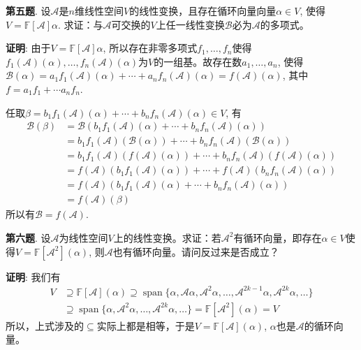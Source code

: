 {\newpageorvspace


{\bf 第五题}. 设$\mathscr{A}$是$n$维线性空间$V$的线性变换，且存在循环向量向量$\alpha \in V$, 使得$V = \mathbb{F}[\mathscr{A}]\alpha$. 求证：与$\mathscr{A}$可交换的$V$上任一线性变换$\mathscr{B}$必为$\mathscr{A}$的多项式。

\newpageorvspace

{\bf 证明}: 由于$V = \mathbb{F}[\mathscr{A}]\alpha$, 所以存在非零多项式$f_1, \ldots, f_n$使得$f_1(\mathscr{A})(\alpha), \ldots, f_n(\mathscr{A})(\alpha)$为$V$的一组基。故存在数$a_1, \ldots, a_n$, 使得$\mathscr{B}(\alpha) = a_1 f_1(\mathscr{A})(\alpha) + \cdots + a_n f_n(\mathscr{A})(\alpha) = f(\mathscr{A})(\alpha)$, 其中$f = a_1 f_1 + \cdots a_n f_n$.

任取$\beta = b_1 f_1(\mathscr{A})(\alpha) + \cdots + b_n f_n(\mathscr{A})(\alpha) \in V$, 有
\begin{align*}
\mathscr{B} (\beta) & = \mathscr{B} (b_1 f_1(\mathscr{A})(\alpha) + \cdots + b_n f_n(\mathscr{A})(\alpha)) \\
& = b_1 f_1(\mathscr{A}) (\mathscr{B}(\alpha)) + \cdots + b_n f_n(\mathscr{A})(\mathscr{B}(\alpha)) \\
& = b_1 f_1(\mathscr{A}) (f(\mathscr{A})(\alpha)) + \cdots + b_n f_n(\mathscr{A})(f(\mathscr{A})(\alpha)) \\
& = f(\mathscr{A})(b_1 f_1(\mathscr{A})(\alpha)) + \cdots + f(\mathscr{A})(b_n f_n(\mathscr{A})(\alpha)) \\
& = f(\mathscr{A}) (b_1 f_1(\mathscr{A})(\alpha) + \cdots + b_n f_n(\mathscr{A})(\alpha)) \\
& = f(\mathscr{A}) (\beta)
\end{align*}
所以有$\mathscr{B} = f(\mathscr{A})$.


\newpageorvspace


{\bf 第六题}. 设$\mathscr{A}$为线性空间$V$上的线性变换。求证：若$\mathscr{A}^2$有循环向量，即存在$\alpha\in V$使得$V = \mathbb{F}[\mathscr{A}^2](\alpha)$, 则$\mathscr{A}$也有循环向量。请问反过来是否成立？

\newpageorvspace

{\bf 证明}: 我们有
\begin{align*}
V & \supseteq \mathbb{F}[\mathscr{A}](\alpha) \supseteq \operatorname{span} \{ \alpha, \mathscr{A}\alpha, \mathscr{A}^2\alpha, \ldots, \mathscr{A}^{2k-1}\alpha, \mathscr{A}^{2k}\alpha, \ldots \} \\
& \supseteq \operatorname{span} \{ \alpha, \mathscr{A}^2\alpha, \ldots, \mathscr{A}^{2k}\alpha, \ldots \} = \mathbb{F}[\mathscr{A}^2](\alpha) = V
\end{align*}
所以，上式涉及的$\subseteq$实际上都是相等，于是$V = \mathbb{F}[\mathscr{A}](\alpha)$, $\alpha$也是$\mathscr{A}$的循环向量。

}
